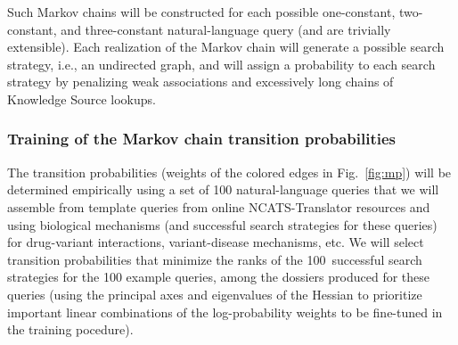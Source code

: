 \documentclass[11pt,notitlepage]{article}
\begin{document}
Such Markov chains will be constructed for each possible one-constant, two-constant,
and three-constant natural-language query (and are trivially extensible). 
 Each realization of the
Markov chain will generate a possible search strategy, i.e., an undirected graph,
and will assign a probability to each search strategy by penalizing weak associations and excessively long chains
of Knowledge Source lookups.

\subsubsection{Training of the Markov chain transition probabilities}
The transition probabilities (weights of the
colored edges in Fig.~\ref{fig:mp}) will be determined empirically using a set
of 100 natural-language queries that we will assemble from template queries from
online NCATS-Translator resources and using biological mechanisms (and
successful search strategies for these queries)
for drug-variant interactions, variant-disease mechanisms, etc. We will select
transition probabilities that minimize the ranks of the 100~successful search
strategies for the 100 example queries, among the dossiers produced for these
queries (using the principal axes and eigenvalues of the Hessian to
prioritize important linear combinations of the log-probability weights to
be fine-tuned in the training pocedure).
\end{document}

